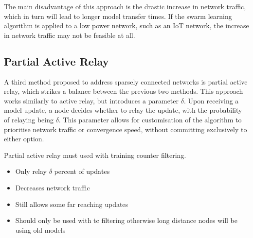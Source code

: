 The main disadvantage of this approach is the drastic increase in network traffic, which in turn will lead to longer model transfer times. If the swarm learning algorithm is applied to a low power network, such as an IoT network, the increase in network traffic may not be feasible at all.

\subsection{Partial Active Relay}
A third method proposed to address sparsely connected networks is partial active relay, which strikes a balance between the previous two methods. This approach works similarly to active relay, but introduces a parameter $\delta$. Upon receiving a model update, a node decides whether to relay the update, with the probability of relaying being $\delta$. This parameter allows for customisation of the algorithm to prioritise network traffic or convergence speed, without committing exclusively to either option.

Partial active relay must used with training counter filtering.
\begin{itemize}
	\item Only relay $\delta$ percent of updates
	\item Decreases network traffic
	\item Still allows some far reaching updates
	\item Should only be used with tc filtering otherwise long distance nodes will be using old models
\end{itemize}
